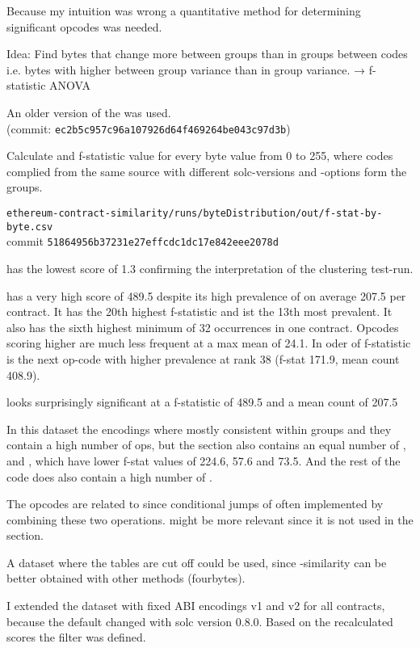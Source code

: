 \documentclass[../main.tex]{subfiles}
\begin{document}
Because my intuition was wrong a quantitative method for determining significant opcodes was needed.

Idea: Find bytes that change more between groups than in groups between codes i.e. bytes with higher between group variance than in group variance. → f-statistic ANOVA

An older version of the  was used.\\
(commit: \texttt{ec2b5c957c96a107926d64f469264be043c97d3b})

Calculate and f-statistic value for every byte value from 0 to 255, where codes complied from the same source with different solc-versions and -options form the groups.

\texttt{ethereum-contract-similarity/runs/byteDistribution/out/f-stat-by-byte.csv}\\
commit \texttt{51864956b37231e27effcdc1dc17e842eee2078d}

 has the lowest score of 1.3 confirming the interpretation of the clustering test-run.

 has a very high score of 489.5 despite its high prevalence of on average 207.5 per contract. It has the 20th highest f-statistic and ist the 13th most prevalent. It also has the sixth highest minimum of 32 occurrences in one contract. Opcodes scoring higher are much less frequent at a max mean of 24.1. In oder of f-statistic  is the next op-code with higher prevalence at rank 38 (f-stat 171.9, mean count 408.9).

 looks surprisingly significant at a f-statistic of 489.5 and a mean count of 207.5

In this dataset the  encodings where mostly consistent within groups and they contain a high number of  ops, but the  section also contains an equal number of ,  and , which have lower f-stat values of 224.6, 57.6 and 73.5. And the rest of the code does also contain a high number of .

The  opcodes are related to  since conditional jumps of often implemented by combining these two operations.  might be more relevant since it is not used in the  section.

A dataset where the  tables are cut off could be used, since -similarity can be better obtained with other methods (fourbytes).

I extended the dataset with fixed ABI encodings v1 and v2 for all contracts, because the default changed with solc version 0.8.0.
Based on the recalculated scores the  filter was defined.
\end{document}
